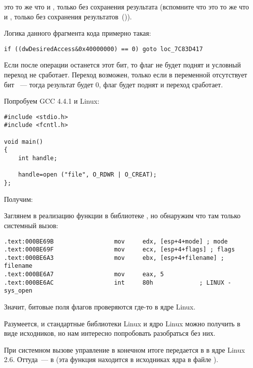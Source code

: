 \TEST это то же что и \AND, только без сохранения результата 
(вспомните что \CMP это то же что и \SUB, только без сохранения результатов~()).

Логика данного фрагмента кода примерно такая:

\begin{lstlisting}
if ((dwDesiredAccess&0x40000000) == 0) goto loc_7C83D417
\end{lstlisting}

Если после операции \AND останется этот бит, то флаг \ZF не будет поднят и условный переход 
\JZ не сработает. 
Переход возможен, только если в переменной  отсутствует бит ~--- 
тогда результат \AND будет 0, флаг \ZF будет поднят и переход сработает.

Попробуем GCC 4.4.1 и Linux:

\begin{lstlisting}
#include <stdio.h>
#include <fcntl.h>

void main()
{
	int handle;

	handle=open ("file", O_RDWR | O_CREAT);
};
\end{lstlisting}

Получим:



Заглянем в реализацию функции  в библиотеке , но обнаружим что там 
только системный вызов:

\begin{lstlisting}[caption=open() (libc.so.6)]
.text:000BE69B                 mov     edx, [esp+4+mode] ; mode
.text:000BE69F                 mov     ecx, [esp+4+flags] ; flags
.text:000BE6A3                 mov     ebx, [esp+4+filename] ; filename
.text:000BE6A7                 mov     eax, 5
.text:000BE6AC                 int     80h             ; LINUX - sys_open
\end{lstlisting}

Значит, битовые поля флагов  проверяются где-то в ядре Linux.

Разумеется, и стандартные библиотеки Linux и ядро Linux можно получить в виде исходников, 
но нам интересно попробовать разобраться без них.

При системном вызове  управление в конечном итоге передается в  в ядре Linux 2.6. 
Оттуда~--- в  (эта функция находится в исходниках ядра в файле ).

